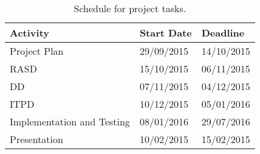 \begin{table}
    \centering
    \begin{tabular}{| l | l | l |}
        \hline
        \textbf{Activity}   & \textbf{Start Date}   & \textbf{Deadline} \\
		\hline
        Project Plan				& 29/09/2015		& 14/10/2015\\
        \hline
        RASD						& 15/10/2015		& 06/11/2015\\
		\hline
        DD							& 07/11/2015		& 04/12/2015\\
		\hline
        ITPD						& 10/12/2015		& 05/01/2016\\
		\hline
		Implementation and Testing	& 08/01/2016		& 29/07/2016\\
        \hline
        Presentation				& 10/02/2015		& 15/02/2015\\
		\hline
        
    \end{tabular}
    \caption{Schedule for project tasks.}
    \label{tab:schedule}
\end{table}